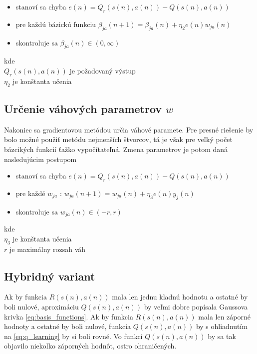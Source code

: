 \begin{itemize}
\item stanoví sa chyba $e(n) = Q_r(s(n), a(n)) - Q(s(n), a(n))$
\item pre každú bázickú funkciu  $\beta_{ja}(n+1)= \beta_{ja}(n) + \eta_2 e(n)w_{ja}(n)$
\item skontroluje sa $\beta_{ja}(n) \in (0, \infty)$
\end{itemize}

kde \\
$Q_r(s(n), a(n))$ je požadovaný výstup \\
$\eta_2$ je konštanta učenia \\


\subsection{Určenie váhových parametrov $w$}

Nakoniec sa gradientovou metódou určia váhové paramete. Pre presné
riešenie by bolo možné použiť metódu nejmenších štvorcov, tá je však pre veľký počet
bázcikých funkcií ťažko vypočítateľná. Zmena parametrov je potom daná nasledujúcim postupom

\begin{itemize}
\item stanoví sa chyba $e(n) = Q_r(s(n), a(n)) - Q(s(n), a(n))$
\item pre každé $w_{ja}$ : $w_{ja}(n+1)= w_{ja}(n) + \eta_3 e(n)y_j(n)$
\item skontroluje sa $w_{ja}(n) \in (-r, r)$
\end{itemize}

kde \\
$\eta_3$ je konštanta učenia \\
$r$ je maximálny rozsah váh \\

\subsection{Hybridný variant}

Ak by funkcia $R(s(n), a(n))$ mala len jednu kladnú hodnotu a ostatné by boli
nulové, aproximáciu $Q(s(n), a(n))$ by veľmi dobre popísala Gaussova krivka \ref{eq:basis_functions}.
Ak by funkcia $R(s(n), a(n))$ mala len záporné hodnoty a ostatné by boli
nulové, funkcia $Q(s(n), a(n))$ by s ohliadnutím na \ref{eq:q_learning} by
si boli rovné. Vo funkcí $Q(s(n), a(n))$ by sa tak objavilo niekoľko záporných
hodnôt, ostro ohraničených.

